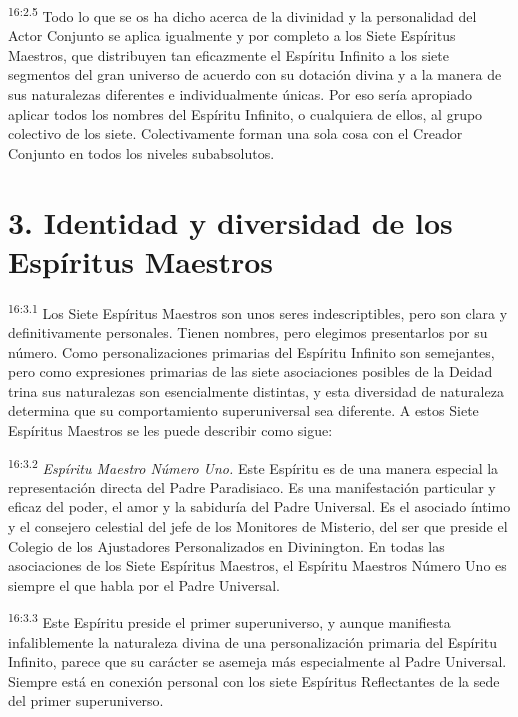 \par
\textsuperscript{16:2.5} Todo lo que se os ha dicho acerca de la divinidad y la personalidad del Actor Conjunto se aplica igualmente y por completo a los Siete Espíritus Maestros, que distribuyen tan eficazmente el Espíritu Infinito a los siete segmentos del gran universo de acuerdo con su dotación divina y a la manera de sus naturalezas diferentes e individualmente únicas. Por eso sería apropiado aplicar todos los nombres del Espíritu Infinito, o cualquiera de ellos, al grupo colectivo de los siete. Colectivamente forman una sola cosa con el Creador Conjunto en todos los niveles subabsolutos.

\section*{3. Identidad y diversidad de los Espíritus Maestros}
\par
\textsuperscript{16:3.1} Los Siete Espíritus Maestros son unos seres indescriptibles, pero son clara y definitivamente personales. Tienen nombres, pero elegimos presentarlos por su número. Como personalizaciones primarias del Espíritu Infinito son semejantes, pero como expresiones primarias de las siete asociaciones posibles de la Deidad trina sus naturalezas son esencialmente distintas, y esta diversidad de naturaleza determina que su comportamiento superuniversal sea diferente. A estos Siete Espíritus Maestros se les puede describir como sigue:

\par
\textsuperscript{16:3.2} \textit{Espíritu Maestro Número Uno.} Este Espíritu es de una manera especial la representación directa del Padre Paradisiaco. Es una manifestación particular y eficaz del poder, el amor y la sabiduría del Padre Universal. Es el asociado íntimo y el consejero celestial del jefe de los Monitores de Misterio, del ser que preside el Colegio de los Ajustadores Personalizados en Divinington. En todas las asociaciones de los Siete Espíritus Maestros, el Espíritu Maestros Número Uno es siempre el que habla por el Padre Universal.

\par
\textsuperscript{16:3.3} Este Espíritu preside el primer superuniverso, y aunque manifiesta infaliblemente la naturaleza divina de una personalización primaria del Espíritu Infinito, parece que su carácter se asemeja más especialmente al Padre Universal. Siempre está en conexión personal con los siete Espíritus Reflectantes de la sede del primer superuniverso.

